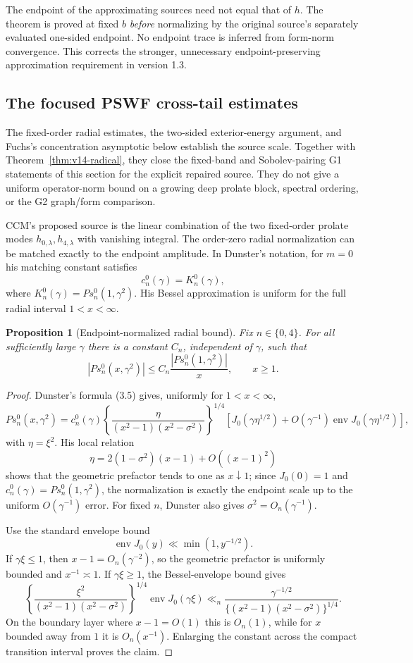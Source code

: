 \documentclass[11pt]{article}
\newtheorem{proposition}[theorem]{Proposition}
\theoremstyle{remark}
\begin{document}
The endpoint of the approximating sources need not equal that of $h$.
The theorem is proved at fixed $b$ \emph{before} normalizing by the
original source's separately evaluated one-sided endpoint. No endpoint
trace is inferred from form-norm convergence. This corrects the stronger,
unnecessary endpoint-preserving approximation requirement in version 1.3.

\subsection*{The focused PSWF cross-tail estimates}
The fixed-order radial estimates, the two-sided exterior-energy argument,
and Fuchs's concentration asymptotic below establish the source scale.
Together with Theorem~\ref{thm:v14-radical}, they close the fixed-band
and Sobolev-pairing G1 statements of this section for the explicit repaired
source. They do not give a uniform operator-norm bound on a growing deep
prolate block, spectral ordering, or the G2 graph/form comparison.


CCM's proposed source is the linear combination of the two fixed-order prolate modes $h_{0,\lambda},h_{4,\lambda}$ with vanishing integral.  The order-zero radial normalization can be matched exactly to the endpoint amplitude.  In Dunster's notation, for $m=0$ his matching constant satisfies
\[
 c_n^0(\gamma)=K_n^0(\gamma),
\]
where $K_n^0(\gamma)=Ps_n^0(1,\gamma^2)$.  His Bessel approximation is uniform for the full radial interval $1<x<\infty$.

\begin{proposition}[Endpoint-normalized radial bound]\label{prop:endpoint-radial}
Fix $n\in\{0,4\}$.  For all sufficiently large $\gamma$ there is a constant $C_n$, independent of $\gamma$, such that
\[
 |Ps_n^0(x,\gamma^2)|\le C_n\frac{|Ps_n^0(1,\gamma^2)|}{x},
 \qquad x\ge1.
\]
\end{proposition}
\begin{proof}
Dunster's formula (3.5) gives, uniformly for $1<x<\infty$,
\[
 Ps_n^0(x,\gamma^2)
 =c_n^0(\gamma)
 \left\{\frac{\eta}{(x^2-1)(x^2-\sigma^2)}\right\}^{1/4}
 \left[J_0(\gamma\eta^{1/2})
 +O(\gamma^{-1})\operatorname{env}J_0(\gamma\eta^{1/2})\right],
\]
with $\eta=\xi^2$.  His local relation
\[
 \eta=2(1-\sigma^2)(x-1)+O((x-1)^2)
\]
shows that the geometric prefactor tends to one as $x\downarrow1$; since $J_0(0)=1$ and $c_n^0(\gamma)=Ps_n^0(1,\gamma^2)$, the normalization is exactly the endpoint scale up to the uniform $O(\gamma^{-1})$ error.  For fixed $n$, Dunster also gives $\sigma^2=O_n(\gamma^{-1})$.

Use the standard envelope bound
\[
 \operatorname{env}J_0(y)\ll \min(1,y^{-1/2}).
\]
If $\gamma\xi\le1$, then $x-1=O_n(\gamma^{-2})$, so the geometric prefactor is uniformly bounded and $x^{-1}\asymp1$.  If $\gamma\xi\ge1$, the Bessel-envelope bound gives
\[
 \left\{\frac{\xi^2}{(x^2-1)(x^2-\sigma^2)}\right\}^{1/4}
 \operatorname{env}J_0(\gamma\xi)
 \ll_n
 \frac{\gamma^{-1/2}}{\{(x^2-1)(x^2-\sigma^2)\}^{1/4}}.
\]
On the boundary layer where $x-1=O(1)$ this is $O_n(1)$, while for $x$ bounded away from $1$ it is $O_n(x^{-1})$.  Enlarging the constant across the compact transition interval proves the claim.
\end{proof}
\end{document}
